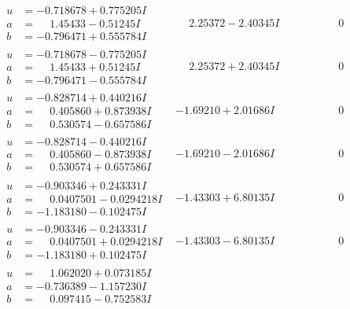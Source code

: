 \documentclass[1p]{elsarticle_modified}
\theoremstyle{definition}
\begin{document}
$$\begin{array}{c|c|c}
\begin{aligned}
u &= -0.718678 + 0.775205 I \\
a &= \phantom{-}1.45433 - 0.51245 I \\
b &= -0.796471 + 0.555784 I\end{aligned}
 & \phantom{-}2.25372 - 2.40345 I & \phantom{-0.000000 } 0 \\ \hline\begin{aligned}
u &= -0.718678 - 0.775205 I \\
a &= \phantom{-}1.45433 + 0.51245 I \\
b &= -0.796471 - 0.555784 I\end{aligned}
 & \phantom{-}2.25372 + 2.40345 I & \phantom{-0.000000 } 0 \\ \hline\begin{aligned}
u &= -0.828714 + 0.440216 I \\
a &= \phantom{-}0.405860 + 0.873938 I \\
b &= \phantom{-}0.530574 - 0.657586 I\end{aligned}
 & -1.69210 + 2.01686 I & \phantom{-0.000000 } 0 \\ \hline\begin{aligned}
u &= -0.828714 - 0.440216 I \\
a &= \phantom{-}0.405860 - 0.873938 I \\
b &= \phantom{-}0.530574 + 0.657586 I\end{aligned}
 & -1.69210 - 2.01686 I & \phantom{-0.000000 } 0 \\ \hline\begin{aligned}
u &= -0.903346 + 0.243331 I \\
a &= \phantom{-}0.0407501 - 0.0294218 I \\
b &= -1.183180 - 0.102475 I\end{aligned}
 & -1.43303 + 6.80135 I & \phantom{-0.000000 } 0 \\ \hline\begin{aligned}
u &= -0.903346 - 0.243331 I \\
a &= \phantom{-}0.0407501 + 0.0294218 I \\
b &= -1.183180 + 0.102475 I\end{aligned}
 & -1.43303 - 6.80135 I & \phantom{-0.000000 } 0 \\ \hline\begin{aligned}
u &= \phantom{-}1.062020 + 0.073185 I \\
a &= -0.736389 - 1.157230 I \\
b &= \phantom{-}0.097415 - 0.752583 I\end{aligned}

\end{array}$$
\end{document}
